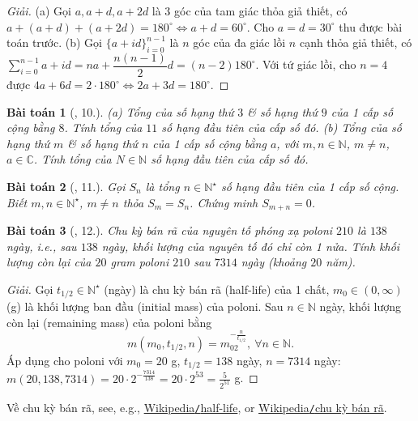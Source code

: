 \documentclass[oneside]{book}
\newtheorem{baitoan}{Bài toán}
\begin{document}
\begin{proof}[Giải]
	(a) Gọi $a,a + d,a + 2d$ là 3 góc của tam giác thỏa giả thiết, có $a + (a + d ) + (a + 2d) = 180^\circ\Leftrightarrow a + d = 60^\circ$. Cho $a = d = 30^\circ$ thu được bài toán trước. (b) Gọi $\{a + id\}_{i=0}^{n-1}$ là $n$ góc của đa giác lồi $n$ cạnh thỏa giả thiết, có $\sum_{i=0}^{n-1} a + id = na + \dfrac{n(n - 1)}{2}d = (n - 2)180^\circ$. Với tứ giác lồi, cho $n = 4$ được $4a + 6d = 2\cdot180^\circ\Leftrightarrow 2a + 3d = 180^\circ$.
\end{proof}

\begin{baitoan}[\cite{TLCT_dai_so_giai_tich_11}, 10.]
	(a) Tổng của số hạng thứ $3$ \& số hạng thứ $9$ của 1 cấp số cộng bằng $8$. Tính tổng của $11$ số hạng đầu tiên của cấp số đó. (b) Tổng của số hạng thứ $m$ \& số hạng thứ $n$ của 1 cấp số cộng bằng $a$, với $m,n\in\mathbb{N}$, $m\ne n$, $a\in\mathbb{C}$. Tính tổng của $N\in\mathbb{N}$ số hạng đầu tiên của cấp số đó.
\end{baitoan}

\begin{baitoan}[\cite{TLCT_dai_so_giai_tich_11}, 11.]
	Gọi $S_n$ là tổng $n\in\mathbb{N}^\star$ số hạng đầu tiên của 1 cấp số cộng. Biết $m,n\in\mathbb{N}^\star$, $m\ne n$ thỏa $S_m = S_n$. Chứng minh $S_{m+n} = 0$.
\end{baitoan}

\begin{baitoan}[\cite{TLCT_dai_so_giai_tich_11}, 12.]
	Chu kỳ bán rã của nguyên tố phóng xạ poloni $210$ là $138$ ngày, i.e., sau $138$ ngày, khối lượng của nguyên tố đó chỉ còn 1 nửa. Tính khối lượng còn lại của $20$ gram poloni $210$ sau $7314$ ngày (khoảng $20$ năm).
\end{baitoan}

\begin{proof}[Giải]
	Gọi $t_{1/2}\in\mathbb{N}^\star$ (ngày) là chu kỳ bán rã (half-life) của 1 chất, $m_0\in(0,\infty)$ (g) là khối lượng ban đầu (initial mass) của poloni. Sau $n\in\mathbb{N}$ ngày, khối lượng còn lại (remaining mass) của poloni bằng
	\begin{equation*}
		m(m_0,t_{1/2},n) = m_02^{-\frac{n}{t_{1/2}}},\ \forall n\in\mathbb{N}.
	\end{equation*}
	Áp dụng cho poloni với $m_0 = 20$ g, $t_{1/2}  =138$ ngày, $n = 7314$ ngày: $m(20,138,7314) = 20\cdot2^{-\frac{7314}{138}} = 20\cdot2^{53} = \frac{5}{2^{51}}$ g.
\end{proof}
Về chu kỳ bán rã, see, e.g., \href{https://en.m.wikipedia.org/wiki/Half-life}{Wikipedia{\tt/}half-life}, or \href{https://vi.wikipedia.org/wiki/Chu_k%E1%BB%B3_b%C3%A1n_r%C3%A3}{Wikipedia{\tt/}chu kỳ bán rã}.
\end{document}
